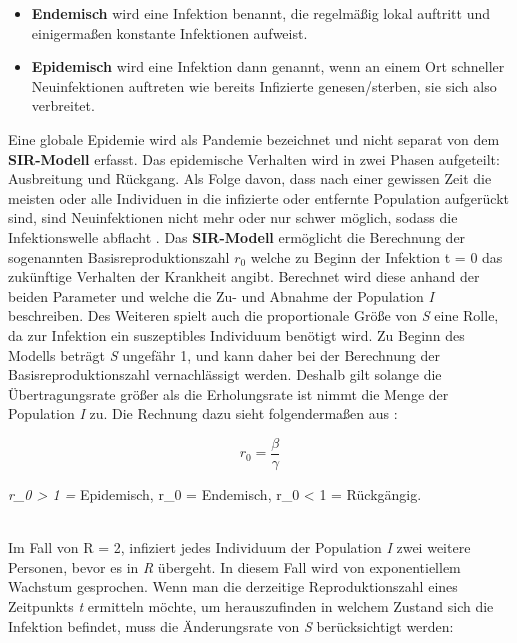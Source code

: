 \documentclass[12pt]{scrartcl} %
\begin{document}
\begin{itemize}
	\item \textbf{Endemisch} wird eine Infektion benannt, die regelmäßig lokal auftritt und einigermaßen konstante Infektionen aufweist.\\
	
  \item \textbf{Epidemisch} wird eine Infektion dann genannt, wenn an einem Ort schneller Neuinfektionen auftreten wie bereits Infizierte genesen/sterben, sie sich also verbreitet.
\end{itemize}

Eine globale Epidemie wird als Pandemie bezeichnet und nicht separat von dem \textbf{SIR-Modell} erfasst. Das epidemische Verhalten wird in zwei Phasen aufgeteilt: Ausbreitung und Rückgang. Als Folge davon, dass nach einer gewissen Zeit die meisten oder alle Individuen in die infizierte oder entfernte Population aufgerückt sind, sind Neuinfektionen nicht mehr oder nur schwer möglich, sodass die Infektionswelle abflacht \cite{3,5}. Das \textbf{SIR-Modell} ermöglicht die Berechnung der sogenannten Basisreproduktionszahl  $r_{0}$
welche zu Beginn der Infektion t = 0 das zukünftige Verhalten der Krankheit angibt. Berechnet wird diese anhand der beiden Parameter \textbeta\space und \textgamma\space welche die Zu- und Abnahme der Population \textit{I} beschreiben. Des Weiteren spielt auch die proportionale Größe von \textit{S} eine Rolle, da zur Infektion ein suszeptibles Individuum benötigt wird. Zu Beginn des Modells beträgt \textit{S} ungefähr 1, und kann daher bei der Berechnung der Basisreproduktionszahl vernachlässigt werden. Deshalb gilt solange die Übertragungsrate \textbeta\space größer als die Erholungsrate \textgamma\space ist nimmt die Menge der Population \textit{I} zu. Die Rechnung dazu sieht folgendermaßen aus \cite{6,3}:

$$ r_{0} = \frac{\beta}{\gamma} $$

\begin{center}
\textit{r_{0} > 1 =} \textnormal{Epidemisch}, r_{0}  = \textnormal{Endemisch}, r_{0} < 1 = \textnormal{Rückgängig.}
\end{center}\\
Im Fall von R = 2, infiziert jedes Individuum der Population \textit{I} zwei weitere Personen, bevor es in \textit{R} übergeht. In diesem Fall wird von exponentiellem Wachstum gesprochen.
Wenn man die derzeitige Reproduktionszahl eines Zeitpunkts \textit{t} ermitteln möchte, um herauszufinden in welchem Zustand sich die Infektion befindet, muss die Änderungsrate von \textit{S} berücksichtigt werden:
\end{document}
